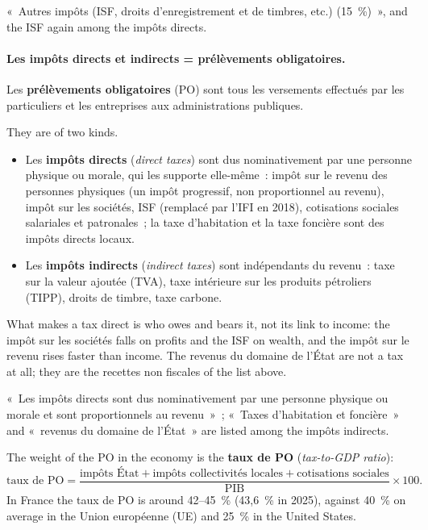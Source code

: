 \begin{remark}
  «~Autres impôts (ISF, droits d'enregistrement et de timbres, etc.) (15~\%)~»,
  and the ISF again among the impôts directs.
\end{remark}

\paragraph{Les impôts directs et indirects = prélèvements obligatoires.}

\begin{definition}
  Les \textbf{prélèvements obligatoires} (PO) sont tous les versements effectués
  par les particuliers et les entreprises aux administrations publiques.
\end{definition}

They are of two kinds.
\begin{itemize}
  \item Les \textbf{impôts directs} (\textit{direct taxes}) sont dus
    nominativement par une personne physique ou morale, qui les supporte
    elle-même~: impôt sur le revenu des personnes physiques (un impôt progressif,
    non proportionnel au revenu), impôt sur les sociétés, ISF (remplacé par
    l'IFI en 2018), cotisations sociales salariales et patronales~; la taxe
    d'habitation et la taxe foncière sont des impôts directs locaux.
  \item Les \textbf{impôts indirects} (\textit{indirect taxes}) sont indépendants
    du revenu~: taxe sur la valeur ajoutée (TVA), taxe intérieure sur les
    produits pétroliers (TIPP), droits de timbre, taxe carbone.
\end{itemize}
What makes a tax direct is who owes and bears it, not its link to income: the
impôt sur les sociétés falls on profits and the ISF on wealth, and the impôt sur
le revenu rises faster than income. The revenus du domaine de l'État are not a
tax at all; they are the recettes non fiscales of the list above.

\begin{remark}
  «~Les impôts directs sont dus nominativement par une personne physique ou
  morale et sont proportionnels au revenu~»~; «~Taxes d'habitation et foncière~»
  and «~revenus du domaine de l'État~» are listed among the impôts indirects.
\end{remark}

The weight of the PO in the economy is the \textbf{taux de PO}
(\textit{tax-to-GDP ratio}):
\[
  \text{taux de PO} = \frac{\text{impôts État} + \text{impôts collectivités
  locales} + \text{cotisations sociales}}{\text{PIB}} \times 100.
\]
In France the taux de PO is around 42--45~\% (43,6~\% in 2025), against
40~\% on average in the Union européenne (UE) and 25~\% in the United States.

